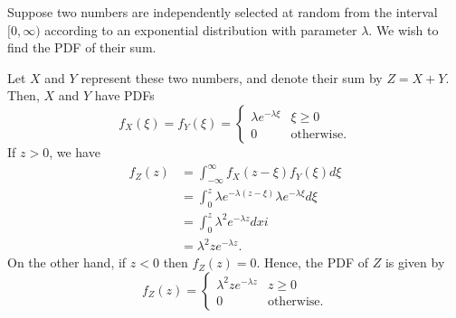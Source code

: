 \begin{example}
Suppose two numbers are independently selected at random from the interval $[0,\infty)$ according to an exponential distribution with parameter $\lambda$. 
We wish to find the PDF of their sum.

Let $X$ and $Y$ represent these two numbers, and denote their sum by $Z = X + Y$.
Then, $X$ and $Y$ have PDFs
\begin{equation*}
f_X (\xi) = f_Y (\xi) = \begin{cases} \lambda e^{-\lambda \xi} & \xi \geq 0 \\
0 & \text{otherwise} . \end{cases}
\end{equation*}
If $z > 0$, we have
\begin{equation*}
\begin{split}
f_Z (z) &= \int_{-\infty}^{\infty} f_X(z - \xi) f_Y(\xi) d\xi \\
&= \int_0^z \lambda e^{-\lambda(z - \xi)} \lambda e^{-\lambda \xi} d\xi \\
&= \int_0^z \lambda^2 e^{-\lambda z} dxi \\
&= \lambda^2 z e^{-\lambda z}.
\end{split}
\end{equation*}
On the other hand, if $z < 0$ then $f_Z(z) = 0$.
Hence, the PDF of $Z$ is given by
\begin{equation*}
f_Z (z) = \begin{cases} \lambda^2 z e^{-\lambda z} & z \geq 0 \\
0 & \text{otherwise} . \end{cases}
\end{equation*}
\end{example}

